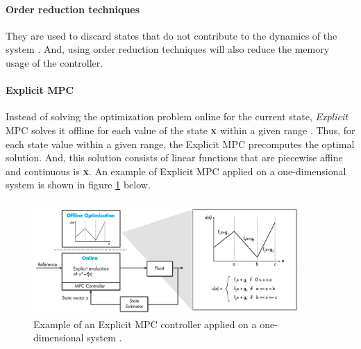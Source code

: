 \documentclass{thesisreport}
\begin{document}
\paragraph{Order reduction techniques} They are used to discard states that do not contribute to the dynamics of the system \cite{4421358}. And, using order reduction techniques will also reduce the memory usage of the controller.

\paragraph{Explicit MPC} Instead of solving the optimization problem online for the current state, \textit{Explicit} MPC solves it offline for each value of the state \textbf{\textsc{x}} within a given range \cite{Bemporad2013}. Thus, for each state value within a given range, the Explicit MPC precomputes the optimal solution. And, this solution consists of linear functions that are piecewise affine and continuous is \textbf{\textsc{x}}. An example of Explicit MPC applied on a one-dimensional system is shown in figure \ref{Explicit_MPC_1D} below.

\begin{figure}[h]
\centering
\includegraphics[width=0.9\textwidth]{Images/Control/Explicit_MPC_a}
\caption{Example of an Explicit MPC controller applied on a one-dimensional system \cite{MathWorks2018_new}.}
\label{Explicit_MPC_1D}
\end{figure}
\end{document}
